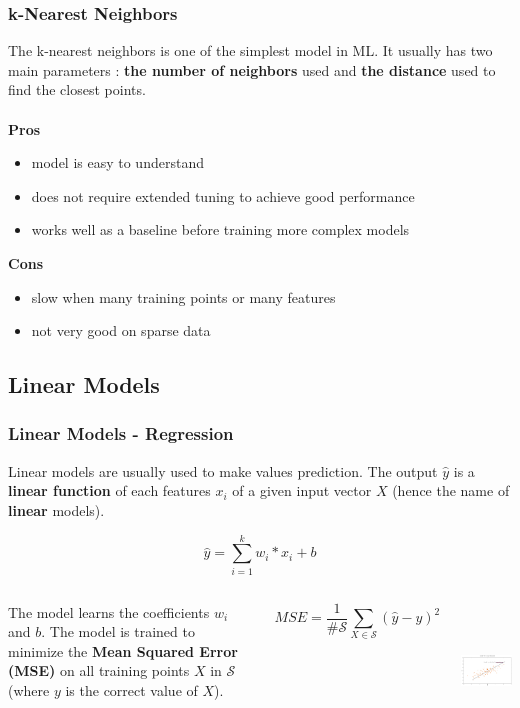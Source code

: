 \documentclass{beamer}
\begin{document}
\begin{frame}
  \frametitle{k-Nearest Neighbors}
  The k-nearest neighbors is one of the simplest model in ML. It usually has two
  main parameters : \textbf{the number of neighbors} used and \textbf{the
  distance} used to find the closest points.
  \\~\\
  \textbf{Pros}
  \begin{itemize}
    \item model is easy to understand
    \item does not require extended tuning to achieve good performance
    \item works well as a baseline before training more complex models
  \end{itemize}

  \textbf{Cons}
  \begin{itemize}
    \item slow when many training points or many features
    \item not very good on sparse data
  \end{itemize}
\end{frame}

\subsection{Linear Models}
\begin{frame}
  \frametitle{Linear Models - Regression}
  Linear models are usually used to make values prediction. The output $\hat{y}$
  is a \textbf{linear function} of each features $x_i$ of a given input vector
  $X$ (hence the name of \textbf{linear} models).

  \begin{equation*}
    \hat{y} = \sum_{i = 1}^k w_i * x_i + b
  \end{equation*}

  \begin{columns}
      \parbox{\linewidth}{The model learns the coefficients $w_i$ and $b$. The
      model is trained to minimize the \textbf{Mean Squared Error (MSE)} on all
      training points $X$ in $\mathcal{S}$ (where $y$ is the correct value of
      $X$).

      \begin{equation*}
        MSE = \frac{1}{\#\mathcal{S}} \sum_{X \in \mathcal{S}} (\hat{y} - y)^2
      \end{equation*}
      }

      \centering
      \includegraphics[height=3.6cm]{img/linear.png}
  \end{columns}
\end{frame}
\end{document}

